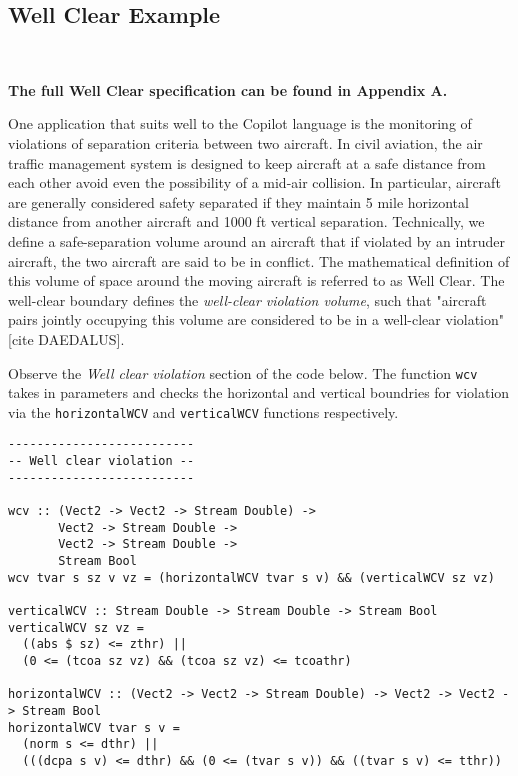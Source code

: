 \subsection{Well Clear Example}~\label{sec:WellClear}

\begin{center}
\textbf{The full Well Clear specification can be found in Appendix A.}
\end{center}

One application that suits well to the Copilot language is the
monitoring of violations of separation criteria between two aircraft.
In civil aviation, the air traffic management  system is designed to  keep
aircraft at a safe distance from each other avoid even the
possibility of a mid-air collision.  In particular,  aircraft are
generally considered safety separated if they maintain 5 mile
horizontal distance from another aircraft and 1000 ft vertical
separation. Technically,  we define  a safe-separation volume around an
aircraft that if violated by an intruder aircraft, the two aircraft
are said to be in conflict. The mathematical definition of this volume
of space around the  moving aircraft  is referred
to as Well Clear. The well-clear boundary defines  the
\emph{well-clear violation volume}, such that "aircraft pairs jointly
occupying this volume are considered to be in a well-clear violation"
[cite DAEDALUS].

Observe the \emph{Well clear violation} section of the code below. The function {\tt wcv} takes in parameters and
checks the horizontal and vertical boundries for violation via the {\tt horizontalWCV} and {\tt verticalWCV} functions respectively. 

\begin{lstlisting}[language = copilot]
--------------------------
-- Well clear violation --
--------------------------

wcv :: (Vect2 -> Vect2 -> Stream Double) ->
       Vect2 -> Stream Double ->
       Vect2 -> Stream Double ->
       Stream Bool
wcv tvar s sz v vz = (horizontalWCV tvar s v) && (verticalWCV sz vz)

verticalWCV :: Stream Double -> Stream Double -> Stream Bool
verticalWCV sz vz =
  ((abs $ sz) <= zthr) ||
  (0 <= (tcoa sz vz) && (tcoa sz vz) <= tcoathr)

horizontalWCV :: (Vect2 -> Vect2 -> Stream Double) -> Vect2 -> Vect2 -> Stream Bool
horizontalWCV tvar s v =
  (norm s <= dthr) ||
  (((dcpa s v) <= dthr) && (0 <= (tvar s v)) && ((tvar s v) <= tthr))
\end{lstlisting}


